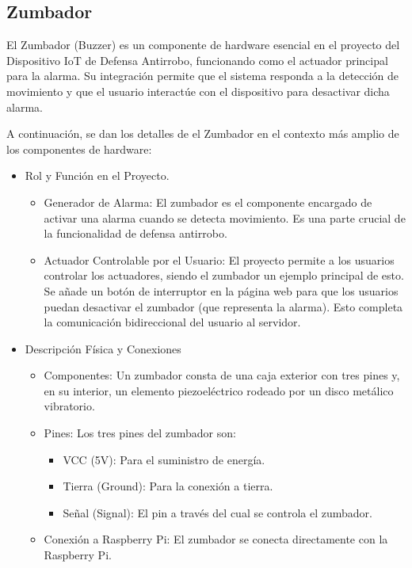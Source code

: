 \documentclass{report}
\begin{document}
\subsection{Zumbador}
El Zumbador (Buzzer) es un componente de hardware esencial en el proyecto del Dispositivo IoT de Defensa Antirrobo, funcionando como el actuador principal 
para la alarma. Su integración permite que el sistema responda a la detección de movimiento y que el usuario interactúe con el dispositivo para 
desactivar dicha alarma.

A continuación, se dan los detalles de el Zumbador en el contexto más amplio de los componentes de hardware:
\begin{itemize}

    \item Rol y Función en el Proyecto.
    \begin{itemize}
        \item Generador de Alarma: El zumbador es el componente encargado de activar una alarma cuando se detecta movimiento. Es una parte crucial 
        de la funcionalidad de defensa antirrobo.
        \item Actuador Controlable por el Usuario: El proyecto permite a los usuarios controlar los actuadores, siendo el zumbador un ejemplo principal 
        de esto. Se añade un botón de interruptor en la página web para que los usuarios puedan desactivar el zumbador (que representa la alarma). 
        Esto completa la comunicación bidireccional del usuario al servidor.
    \end{itemize}

    \item Descripción Física y Conexiones
    \begin{itemize}
        \item Componentes: Un zumbador consta de una caja exterior con tres pines y, en su interior, un elemento piezoeléctrico rodeado por un 
        disco metálico vibratorio.
        \item Pines: Los tres pines del zumbador son:
        \begin{itemize}
            \item VCC (5V): Para el suministro de energía.
            \item Tierra (Ground): Para la conexión a tierra.
            \item Señal (Signal): El pin a través del cual se controla el zumbador.
        \end{itemize}
        \item Conexión a Raspberry Pi: El zumbador se conecta directamente con la Raspberry Pi.
    \end{itemize}


\end{itemize}
\end{document}
